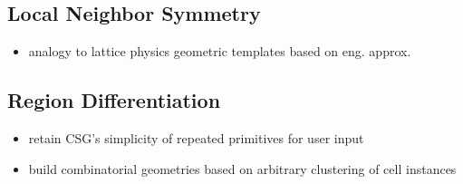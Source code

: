 \subsection{Local Neighbor Symmetry}
\label{sec:chap3-lns}

\begin{itemize}
  \item analogy to lattice physics geometric templates based on eng. approx.
\end{itemize}

\subsection{Region Differentiation}
\label{sec:chap3-region-diff}

\begin{itemize}
  \item retain CSG's simplicity of repeated primitives for user input
  \item build combinatorial geometries based on arbitrary clustering of cell instances
\end{itemize}